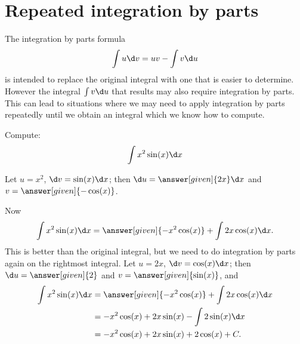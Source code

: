 \documentclass{ximera}
\begin{document}
\section{Repeated integration by parts}

The  integration by parts formula
 \[
\int u \d v= uv - \int v \d u
\]
 is intended to replace the original integral with one that is easier to determine. However the integral $\int v \d u$ that results may also require integration by parts. This can lead to situations where we may need to apply integration by parts repeatedly until we obtain an integral which we know how to compute. 


%

\begin{example}
Compute:
\[
\int x^2\sin(x)\d x
\] 
\begin{explanation}
Let $u=x^2$, $\d v=\sin(x)\d x$; then $\d u=\answer[given]{2x}\d x$ and $v=\answer[given]{-\cos(x)}$. 

Now 
\[
\int x^2\sin(x)\d x=\answer[given]{-x^2\cos(x)}+\int 2x\cos(x)\d x.
\] 
This is better than the original integral, but we need to do
integration by parts again on the rightmost integral. Let $u=2x$, $\d v=\cos(x)\d x$; then $\d u=\answer[given]{2}$
and $v=\answer[given]{\sin(x)}$, and
\begin{align*}
  \int x^2\sin(x)\d x &=\answer[given]{-x^2\cos(x)}+\int 2x\cos(x)\d x \\
  &=-x^2\cos(x)+ 2x\sin(x) - \int 2\sin(x)\d x \\
  &=-x^2\cos(x)+ 2x\sin(x) + 2\cos(x) + C. 
\end{align*}
\end{explanation}
\end{example}
\end{document}
